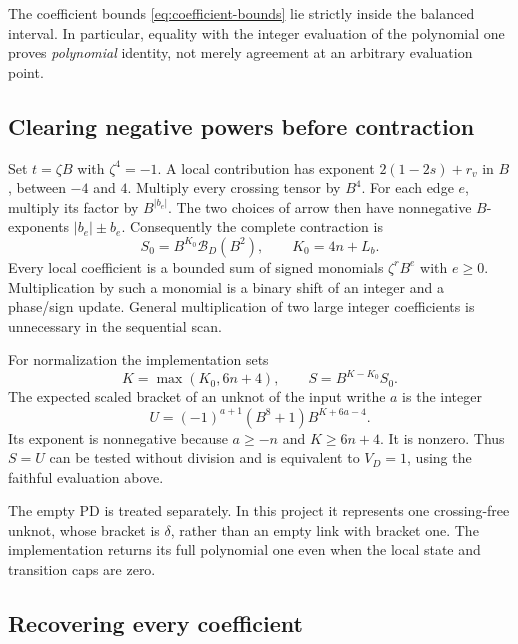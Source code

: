 The coefficient bounds \eqref{eq:coefficient-bounds} lie strictly inside
the balanced interval. In particular, equality with the integer evaluation
of the polynomial one proves \emph{polynomial} identity, not merely
agreement at an arbitrary evaluation point.

\subsection{Clearing negative powers before contraction}

Set $t=\zeta B$ with $\zeta^4=-1$. A local contribution has exponent
$2(1-2s)+r_v$ in $B$, between $-4$ and $4$. Multiply every crossing
tensor by $B^4$. For each edge $e$, multiply its factor by
$B^{|b_e|}$. The two choices of arrow then have nonnegative $B$-exponents
$|b_e|\pm b_e$. Consequently the complete contraction is
\begin{equation}\label{eq:scaled-bracket}
 S_0=B^{K_0}\mathcal B_D(B^2),
 \qquad K_0=4n+L_b.
\end{equation}
Every local coefficient is a bounded sum of signed monomials
$\zeta^r B^e$ with $e\ge0$. Multiplication by such a monomial is a binary
shift of an integer and a phase/sign update. General multiplication of
two large integer coefficients is unnecessary in the sequential scan.

For normalization the implementation sets
\begin{equation}\label{eq:normalization-shift}
 K=\max(K_0,6n+4),\qquad S=B^{K-K_0}S_0.
\end{equation}
The expected scaled bracket of an unknot of the input writhe $a$ is the
integer
\begin{equation}\label{eq:unknot-scalar}
 U=(-1)^{a+1}(B^8+1)B^{K+6a-4}.
\end{equation}
Its exponent is nonnegative because $a\ge-n$ and $K\ge6n+4$.
It is nonzero. Thus $S=U$ can be tested without division and is equivalent
to $V_D=1$, using the faithful evaluation above.

The empty PD is treated separately. In this project it represents one
crossing-free unknot, whose bracket is $\delta$, rather than an empty
link with bracket one. The implementation returns its full polynomial
one even when the local state and transition caps are zero.

\subsection{Recovering every coefficient}

